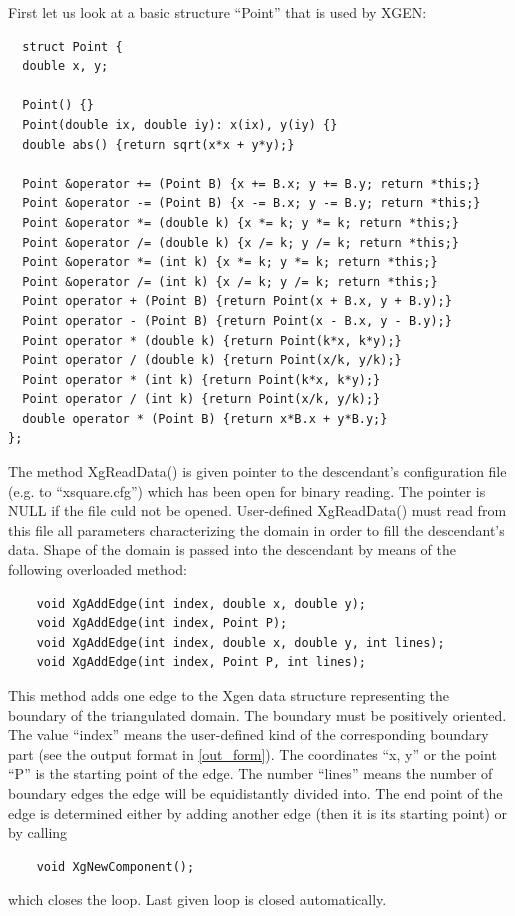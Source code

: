 \documentclass[12pt]{article}
\begin{document}
  First let us look at a basic structure ``Point'' that is used by XGEN:
  \begin{verbatim}
  struct Point {
  double x, y;

  Point() {}
  Point(double ix, double iy): x(ix), y(iy) {}
  double abs() {return sqrt(x*x + y*y);}

  Point &operator += (Point B) {x += B.x; y += B.y; return *this;}
  Point &operator -= (Point B) {x -= B.x; y -= B.y; return *this;}
  Point &operator *= (double k) {x *= k; y *= k; return *this;}
  Point &operator /= (double k) {x /= k; y /= k; return *this;}
  Point &operator *= (int k) {x *= k; y *= k; return *this;}
  Point &operator /= (int k) {x /= k; y /= k; return *this;}
  Point operator + (Point B) {return Point(x + B.x, y + B.y);}
  Point operator - (Point B) {return Point(x - B.x, y - B.y);}
  Point operator * (double k) {return Point(k*x, k*y);}
  Point operator / (double k) {return Point(x/k, y/k);}
  Point operator * (int k) {return Point(k*x, k*y);}
  Point operator / (int k) {return Point(x/k, y/k);}
  double operator * (Point B) {return x*B.x + y*B.y;}
};
  \end{verbatim}  
  The method XgReadData() is given pointer to the descendant's configuration
  file (e.g. to ``xsquare.cfg'') which has been open for binary reading. The pointer
  is NULL if the file culd not be opened. User-defined XgReadData() must read from this
  file all parameters characterizing the domain in order to fill the descendant's 
  data. Shape of the domain is passed into the descendant by means of the following
  overloaded method:
  \begin{verbatim}
    void XgAddEdge(int index, double x, double y);
    void XgAddEdge(int index, Point P);
    void XgAddEdge(int index, double x, double y, int lines);
    void XgAddEdge(int index, Point P, int lines);
  \end{verbatim}
  This method adds one edge to the Xgen data structure representing the
  boundary of the triangulated domain. The boundary must be positively
  oriented. The value ``index'' means the user-defined kind of the
  corresponding boundary part (see the output format in \ref{out_form}).
  The coordinates ``x, y'' or the point ``P'' is the starting point of the edge.
  The number ``lines'' means the number of boundary edges the edge will be
  equidistantly divided into. The end point of the edge is determined either
  by adding another edge (then it is its starting point) or by calling 
  \begin{verbatim}
    void XgNewComponent();
  \end{verbatim}
  which closes the loop. Last given loop is closed automatically. 
\end{document}
